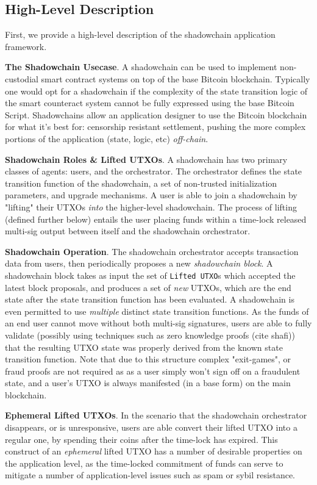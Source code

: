 \documentclass[10pt,a4paper]{article}
\theoremstyle{definition}
\begin{document}
\subsection{High-Level Description}

First, we provide a high-level description of the shadowchain application
framework. 

\textbf{The Shadowchain Usecase}. A shadowchain can be used to implement
non-custodial smart contract systems on top of the base Bitcoin blockchain.
Typically one would opt for a shadowchain if the complexity of the state
transition logic of the smart counteract system cannot be fully expressed using
the base Bitcoin Script.  Shadowchains allow an application designer to use the
Bitcoin blockchain for what it's best for: censorship resistant settlement,
pushing the more complex portions of the application (state, logic, etc)
\emph{off-chain}.

\textbf{Shadowchain Roles \& Lifted UTXOs}. A shadowchain has two primary
classes of agents: users, and the orchestrator.  The orchestrator defines the
state transition function of the shadowchain, a set of non-trusted
initialization parameters, and upgrade mechanisms. A user is able to join a
shadowchain by "lifting" their UTXOs \emph{into} the higher-level shadowchain.
The process of lifting (defined further below) entails the user placing funds
within a time-lock released multi-sig output between itself and the shadowchain
orchestrator. 

\textbf{Shadowchain Operation}. The shadowchain orchestrator accepts
transaction data from users, then periodically proposes a new \emph{shadowchain
block}. A shadowchain block takes as input the set of \texttt{Lifted UTXO}s
which accepted the latest block proposals, and produces a set of \emph{new}
UTXOs, which are the end state after the state transition function has been
evaluated. A shadowchain is even permitted to use \emph{multiple} distinct state
transition functions. As the funds of an end user cannot move without both
multi-sig signatures, users are able to fully validate (possibly using
techniques such as zero knowledge proofs (cite shafi)) that the
resulting UTXO state was properly derived from the known state transition
function.  Note that due to this structure complex "exit-games", or fraud
proofs are not required as as a user simply won't sign off on a fraudulent
state, and a user's UTXO is always manifested (in a base form) on the main
blockchain.

\textbf{Ephemeral Lifted UTXOs}. In the scenario that the shadowchain orchestrator
disappears, or is unresponsive, users are able convert their lifted UTXO into a
regular one, by spending their coins after the time-lock has expired. This
construct of an \emph{ephemeral} lifted UTXO has a number of desirable properties
on the application level, as the time-locked commitment of funds can serve
to mitigate a number of application-level issues such as spam or sybil
resistance.
\end{document}
